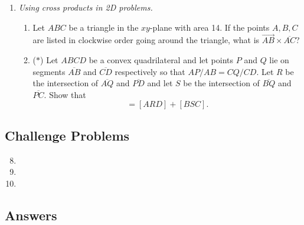 \begin{enumerate}
\begin{enumerate}
\end{enumerate}
\item \emph{Using cross products in 2D problems.}
\begin{enumerate}
\item Let $ABC$ be a triangle in the $xy$-plane with area 14. If the points $A,B,C$ are listed in clockwise order going around the triangle, what is $\overrightarrow{AB}\times\overline{AC}$?
\item ($*$) Let $ABCD$ be a convex quadrilateral and let points $P$ and $Q$ lie on segments $\overline{AB}$ and $\overline{CD}$ respectively so that $AP/AB = CQ/CD$. Let $R$ be the intersection of $\overline{AQ}$ and $\overline{PD}$ and let $S$ be the intersection of $\overline{BQ}$ and $\overline{PC}$. Show that
\begin{equation*}
[PSQR] = [ARD] + [BSC].
\end{equation*}
\end{enumerate}
\end{enumerate}


\newpage
\subsection{Challenge Problems}

\begin{enumerate}\setcounter{enumi}{7}
\item %
\item %
\item %
\end{enumerate}


\newpage
\subsection{Answers}

